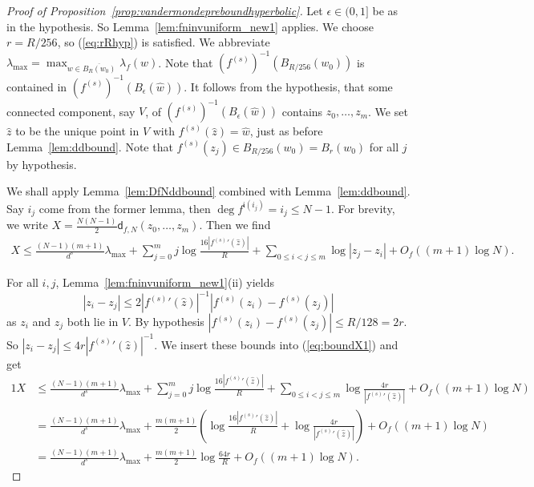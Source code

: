 \documentclass[12pt,oneside,a4]{amsart}
\numberwithin{maincounter}{section}
\numberwithin{equation}{section}
\begin{document}
\begin{proof}[Proof of Proposition~\ref{prop:vandermondepreboundhyperbolic}]
  Let $\epsilon\in (0,1]$ be as in the hypothesis. So
  Lemma~\ref{lem:fninvuniform_new1} applies.
  We choose $r = R/256$, so (\ref{eq:rRhyp}) is satisfied. We abbreviate
  $\lambda_{\mathrm{max}} = \max_{w\in \overline{B_R(w_0)}}
  \lambda_f(w)$.
  Note that   $(f^{(s)})^{-1}(B_{R/256}(w_0))$ is contained in 
  $(f^{(s)})^{-1}(B_{\epsilon}(\widehat w))$. It follows from the
  hypothesis, that
  some  connected component, say $V$, of
  $(f^{(s)})^{-1}(B_{\epsilon}(\widehat w))$ contains
  $z_0,\ldots,z_m$. 
  We set $\widehat z$ to be the unique point in $V$ with
  $f^{(s)}(\widehat z)= \widehat
  w$, just as before Lemma~\ref{lem:ddbound}.
  Note that $f^{(s)}(z_j) \in B_{R/256}(w_0)=B_{r}(w_0)$ for all $j$
  by hypothesis.
  
  We shall apply Lemma~\ref{lem:DfNddbound} combined with
  Lemma~\ref{lem:ddbound}. Say $i_j$ come from the former lemma, then
  $\deg f^{\mathfrak{i}(i_j)} =
  i_j\le N-1$. For brevity, we write $X = \frac{N(N-1)}{2} \mathsf{d}_{f,N}(z_0,\ldots,z_m)$.  
  Then we find
  \begin{equation}
    \label{eq:boundX1}
    \begin{aligned}
      X \le  
      \frac{(N-1)(m+1)}{d^s} \lambda_{\mathrm{max}} +
      \sum_{j=0}^m j\log\frac{16|{f^{(s)}}'(\widehat z)|}{R} +\sum_{0\le
        i<j\le m} \log|z_j-z_i|
      +  O_{f}\left((m+1)\log N\right).
    \end{aligned}
  \end{equation}
  
  For all $i,j$, Lemma~\ref{lem:fninvuniform_new1}(ii) yields
  \begin{equation*}
    |z_i-z_j| 
    \le 2|{f^{(s)}}'(\widehat z)|^{-1}|f^{(s)}(z_i)-f^{(s)}(z_j)| 
  \end{equation*}
  as $z_i$ and $z_j$ both lie in $V$.
  By hypothesis $|f^{(s)}(z_i)-f^{(s)}(z_j)|\le R/128=2r$.
  So $|z_i-z_j|\le 4r |{f^{(s)}}'(\widehat z)|^{-1}$.
  We insert these bounds into (\ref{eq:boundX1}) and get
  \begin{alignat*}1
    X&\le  \frac{(N-1)(m+1)}{d^s}\lambda_{\mathrm{max}} + \sum_{j=0}^m
    j\log\frac{16|{f^{(s)}}'(\widehat z)|}{R} +\sum_{0\le i<j\le m}\log
    \frac{4r}{|{f^{(s)}}'(\widehat z)|} + O_f((m+1)\log N)
    \\
    &=  \frac{(N-1)(m+1)}{d^s} \lambda_{\mathrm{max}}+
    \frac{m(m+1)}{2} \left(\log\frac{16|{f^{(s)}}'(\widehat z)|}{R}
      +\log\frac{4r}{|{f^{(s)}}'(\widehat z)|}\right)
    + O_f((m+1)\log N)
    \\
    &=
      \frac{(N-1)(m+1)}{d^s}    \lambda_{\mathrm{max}}  +
    \frac{m(m+1)}{2}\log\frac{64r}{R} +O_f((m+1)\log N).
  \end{alignat*}


\end{proof}
\end{document}

